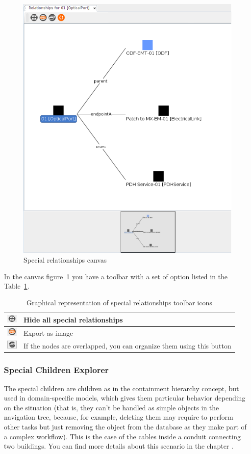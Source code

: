 \documentclass[a4paper]{article}
\begin{document}
		\begin{figure}[h!]
			\centering
			\includegraphics[width=0.4\linewidth]{img/graphical_representation_relationships.png}
			\caption{Special relationships canvas}
			\label{fig:graphical_representation_relationships}
		\end{figure}
			
		In the canvas figure~\ref{fig:graphical_representation_relationships} you have a toolbar with a set of option listed in the Table~\ref{tab:graphical_representation_relationships_toolbar_icons}.
			
		\begin{table}[h!]
			\centering
			\begin{tabular}{cl}
				\includegraphics[width=0.5cm]{img/icon_collapse_all.png} & Hide all special relationships\\
				\midrule
				\includegraphics[width=0.5cm]{img/icon_export_as_image.png} & Export as image\\
				\midrule
				\includegraphics[width=0.5cm]{img/icon_reorganize_nodes.png} & If the nodes are overlapped, you can organize them using this button\\
				\midrule
			\end{tabular}
			\caption{Graphical representation of special relationships toolbar icons}
			\label{tab:graphical_representation_relationships_toolbar_icons}
		\end{table}
			
		\subsubsection{Special Children Explorer} \label{sec:extra_explorers_children_explorer}							
		The special children are children as in the containment hierarchy concept, but used in domain-specific models, which gives them particular behavior depending on the situation (that is, they can't be handled as simple objects in the navigation tree, because, for example, deleting them may require to perform other tasks but just removing the object from the database as they make part of a complex workflow). This is the case of the cables inside a conduit connecting two buildings. You can find more details about this scenario in the chapter \textbf{}.
						
\end{document}
